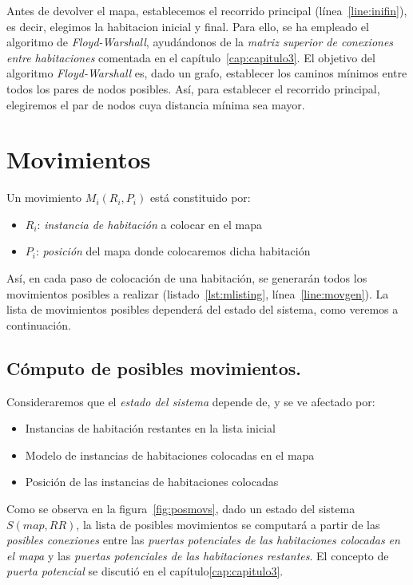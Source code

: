 Antes de devolver el mapa, establecemos el recorrido principal (línea~\ref{line:inifin}), es decir, elegimos la habitacion inicial y final. Para ello, se ha empleado el algoritmo de \emph{Floyd-Warshall}, ayudándonos de la \emph{matriz superior de conexiones entre habitaciones} comentada en el capítulo~\ref{cap:capitulo3}. El objetivo del algoritmo \emph{Floyd-Warshall} \cite{floydwarshall} es, dado un grafo, establecer los caminos mínimos entre todos los pares de nodos posibles. Así, para establecer el recorrido principal, elegiremos el par de nodos cuya distancia mínima sea mayor.

\section{Movimientos}

Un movimiento $M_i(R_i,P_i)$ está constituido por:

\begin{itemize}
	\item$R_i$: \emph{instancia de habitación} a colocar en el mapa
	\item$P_i$: \emph{posición} del mapa donde colocaremos dicha habitación
\end{itemize}

Así, en cada paso de colocación de una habitación, se generarán todos los movimientos posibles a realizar (listado~\ref{lst:mlisting}, línea~\ref{line:movgen}). La lista de movimientos posibles dependerá del estado del sistema, como veremos a continuación.

\subsection{Cómputo de posibles movimientos.}

Consideraremos que el \emph{estado del sistema} depende de, y se ve afectado por:

\begin{itemize}
	\item Instancias de habitación restantes en la lista inicial
	\item Modelo de instancias de habitaciones colocadas en el mapa
	\item Posición de las instancias de habitaciones colocadas
\end{itemize}

Como se observa en la figura~\ref{fig:posmovs}, dado un estado del sistema $S(map,RR)$, la lista de posibles movimientos se computará a partir de las \emph{posibles conexiones} entre las \emph{puertas potenciales de las habitaciones colocadas en el mapa} y las \emph{puertas potenciales de las habitaciones restantes}. El concepto de \emph{puerta potencial} se discutió en el capítulo\ref{cap:capitulo3}.

